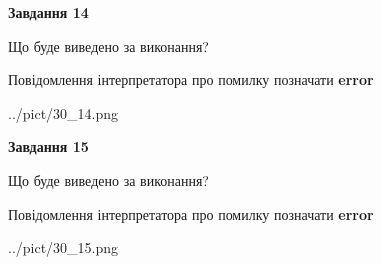 \documentclass[11pt, ukrainian]{article}
\begin{document}
{\begin {large}
{\begin {center}\textbf{Завдання 14}\end {center}}\par
Що буде виведено за виконання? \par
Повідомлення інтерпретатора про помилку позначати \textbf{error}

\begin{center}
	{../pict/30_14.png}
\end{center}
\newpage

{\begin {center}\textbf{Завдання 15}\end {center}}\par
Що буде виведено за виконання? \par
Повідомлення інтерпретатора про помилку позначати \textbf{error}

\begin{center}
	{../pict/30_15.png}
\end{center}
\newpage

\end {large}}
\end{document}
